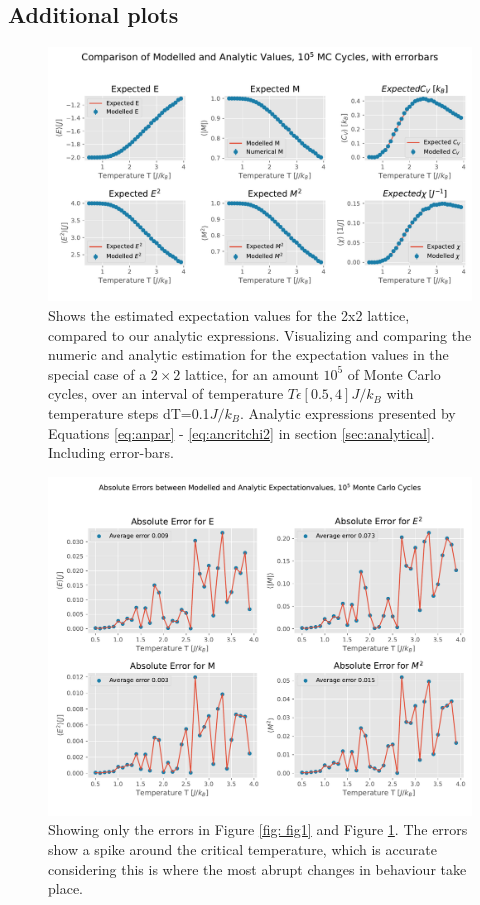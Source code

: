\documentclass[10pt, nofootinbib, twocolumn]{revtex4-1}
\begin{document}
\clearpage
\subsection{Additional plots}\label{sec:plots}
\begin{figure}[H]
    \includegraphics[width = 1\textwidth]{figures/expected_values_errors.pdf} 
    \caption{Shows the estimated expectation values for the 2x2 lattice, compared to our analytic expressions. Visualizing and comparing the numeric and analytic estimation for the expectation values in the special case of a $2\times 2$  lattice, for an amount $10^5$ of Monte Carlo cycles, over an interval of temperature $T\epsilon [0.5,4]J/k_B$ with temperature steps dT=0.1$J/k_B$. Analytic expressions presented by Equations \ref{eq:anpar} - \ref{eq:ancritchi2} in section \ref{sec:analytical}. Including error-bars.}
    \label{fig: fig1errors}
\end{figure} 

\begin{figure}
    \centering
    \includegraphics[width = 1\textwidth]{figures/only_errors.pdf} 
    \caption{Showing only the errors in Figure \ref{fig: fig1} and Figure \ref{fig: fig1errors}. The errors show a spike around the critical temperature, which is accurate considering this is where the most abrupt changes in behaviour take place.}
    \label{fig: fig1onlyerrors}
\end{figure} 
\end{document}
